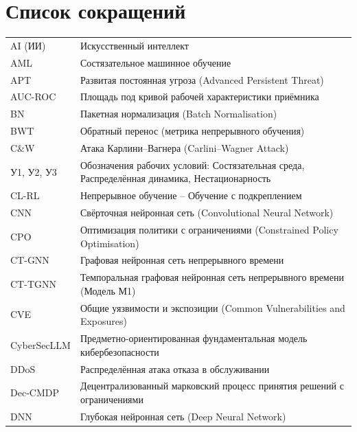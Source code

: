 
\chapter*{Список сокращений}

\begin{longtable}{@{}p{3.8cm} p{10cm}@{}}
AI (ИИ) & Искусственный интеллект \\
AML & Состязательное машинное обучение \\
APT & Развитая постоянная угроза (Advanced Persistent Threat) \\
AUC-ROC & Площадь под кривой рабочей характеристики приёмника \\
BN & Пакетная нормализация (Batch Normalisation) \\
BWT & Обратный перенос (метрика непрерывного обучения) \\
C\&W & Атака Карлини--Вагнера (Carlini--Wagner Attack) \\
У1, У2, У3 & Обозначения рабочих условий: Состязательная среда, Распределённая динамика, Нестационарность \\
CL-RL & Непрерывное обучение -- Обучение с подкреплением \\
CNN & Свёрточная нейронная сеть (Convolutional Neural Network) \\
CPO & Оптимизация политики с ограничениями (Constrained Policy Optimisation) \\
CT-GNN & Графовая нейронная сеть непрерывного времени \\
CT-TGNN & Темпоральная графовая нейронная сеть непрерывного времени (Модель М1) \\
CVE & Общие уязвимости и экспозиции (Common Vulnerabilities and Exposures) \\
CyberSecLLM & Предметно-ориентированная фундаментальная модель кибербезопасности \\
DDoS & Распределённая атака отказа в обслуживании \\
Dec-CMDP & Децентрализованный марковский процесс принятия решений с ограничениями \\
DNN & Глубокая нейронная сеть (Deep Neural Network) \\

\end{longtable}
